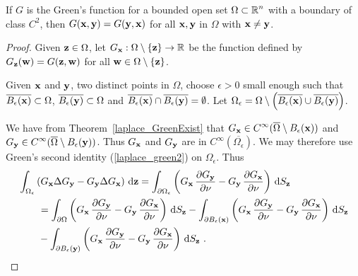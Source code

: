 \begin{prop} \label{GxyGyx}
If $G$ is the Green's function for a bounded open set
$\displaystyle \Omega \subset \mathbb{R}^n$
with a boundary of class $\displaystyle C^2$, then
$G(\mathbf{x},\mathbf{y}) = G(\mathbf{y},\mathbf{x})$
for all $\mathbf{x},\mathbf{y}$ in $\Omega$ with $\mathbf{x}\neq \mathbf{y}$.
\end{prop}

\begin{proof}
Given $\mathbf{z} \in \Omega$, let
$G_{\mathbf{x}}:\Omega \setminus \{\mathbf{z}\} \to \mathbb{R}$
be the function defined by $G_{\mathbf{z}}(\mathbf{w}) = G(\mathbf{z},\mathbf{w})$
for all $\mathbf{w} \in \Omega \setminus \{\mathbf{z}\}$.

Given $\mathbf{x}$ and $\mathbf{y}$, two distinct points in $\Omega$,
choose $\epsilon >0$ small enough such that
$\overline{B_{\epsilon}(\mathbf{x})} \subset \Omega$,
$\overline{B_{\epsilon}(\mathbf{y})} \subset \Omega$ and
$\overline{B_{\epsilon}(\mathbf{x})} \cap
\overline{B_{\epsilon}(\mathbf{y})} = \emptyset$.
Let $\Omega_\epsilon = \Omega \setminus
\left(\overline{B_{\epsilon}(\mathbf{x})} \cup
\overline{B_{\epsilon}(\mathbf{y})} \right)$.

We have from Theorem~\ref{laplace_GreenExist} that
$\displaystyle G_{\mathbf{x}} \in
C^\infty(\overline{\Omega}\setminus B_{\epsilon}(\mathbf{x}))$ and
$\displaystyle G_{\mathbf{y}} \in
C^\infty(\overline{\Omega}\setminus B_{\epsilon}(\mathbf{y}))$.
Thus $G_{\mathbf{x}}$ and $G_{\mathbf{y}}$ are in
$\displaystyle C^\infty(\overline{\Omega_{\epsilon}})$.  We may therefore use
Green's second identity (\ref{laplace_green2}) on $\Omega_{\epsilon}$.
Thus
\begin{equation} \label{laplace_GequG}
\begin{split}
&\int_{\Omega_{\epsilon}} \left( G_{\mathbf{x}} \Delta G_{\mathbf{y}} - G_{\mathbf{y}}
\Delta G_{\mathbf{x}} \right) \,\mathrm{d}{\mathbf{z}}
= \int_{\partial \Omega_{\epsilon}} \left( G_{\mathbf{x}}\,\frac{\partial{G_{\mathbf{y}}}}{\partial \mathbf{\nu}} 
- G_{\mathbf{y}}\,\frac{\partial{G_{\mathbf{x}}}}{\partial \mathbf{\nu}} \right) \,\mathrm{d}{S}_{\mathbf{z}} \\
& \qquad = \int_{\partial \Omega} \left( G_{\mathbf{x}}\,\frac{\partial{G_{\mathbf{y}}}}{\partial \mathbf{\nu}} 
- G_{\mathbf{y}}\,\frac{\partial{G_{\mathbf{x}}}}{\partial \mathbf{\nu}} \right) \,\mathrm{d}{S}_{\mathbf{z}}
- \int_{\partial B_{\epsilon}(\mathbf{x})}
\left( G_{\mathbf{x}}\,\frac{\partial{G_{\mathbf{y}}}}{\partial \mathbf{\nu}} 
- G_{\mathbf{y}}\,\frac{\partial{G_{\mathbf{x}}}}{\partial \mathbf{\nu}} \right) \,\mathrm{d}{S}_{\mathbf{z}} \\
& \qquad - \int_{\partial B_{\epsilon}(\mathbf{y})}
\left( G_{\mathbf{x}}\,\frac{\partial{G_{\mathbf{y}}}}{\partial \mathbf{\nu}} 
- G_{\mathbf{y}}\,\frac{\partial{G_{\mathbf{x}}}}{\partial \mathbf{\nu}} \right) \,\mathrm{d}{S}_{\mathbf{z}} \ .
\end{split}
\end{equation}


\end{proof}
